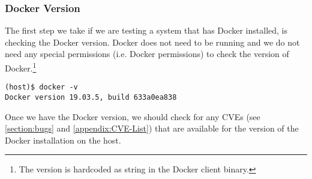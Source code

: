 \subsubsection{Docker Version}\label{subsubsection:version}
The first step we take if we are testing a system that has Docker installed, is checking the Docker version. Docker does not need to be running and we do not need any special permissions (i.e. Docker permissions) to check the version of Docker.\footnote{The version is hardcoded as string in the Docker client binary.}

\begin{lstlisting}[caption={Show Docker version.},captionpos=b]
(host)$ docker -v
Docker version 19.03.5, build 633a0ea838
\end{lstlisting}

Once we have the Docker version, we should check for any CVEs (see \autoref{section:bugs} and \autoref{appendix:CVE-List}) that are available for the version of the Docker installation on the host.
